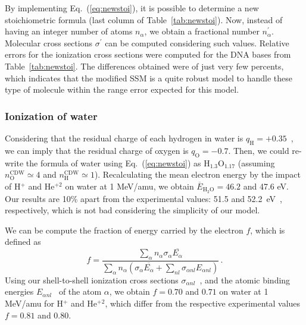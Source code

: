 \documentclass[preprint,12pt]{article}
\begin{document}
By implementing Eq.~(\ref{eq:newstoi}), it is possible to determine a 
new stoichiometric formula (last column of Table~\ref{tab:newstoi}). 
Now, instead of having an integer number of atoms $n_{\alpha}$, we obtain 
a fractional number $n_{\alpha}^{\prime}$. 
Molecular cross sections $\sigma^{\prime}$ can be computed considering 
such values. Relative errors for the ionization cross sections were 
computed for the DNA bases from Table~\ref{tab:newstoi}. The differences 
obtained were of just very few percents, which indicates that the modified 
SSM is a quite robust model to handle these type of molecule within 
the range error expected for this model.


\subsubsection{Ionization of water}

Considering that the residual charge of each hydrogen in water is 
$q_{\text{H}}=+0.35$~\cite{rappe1991}, we can imply that the residual charge 
of oxygen is $q_{\text{O}}=-0.7$. Then, we could re-write the formula 
of water using Eq.~(\ref{eq:newstoi}) as H$_{1.3}$O$_{1.17}$ (assuming
$n_{\text{O}}^{\text{CDW}}\simeq 4$ and $n_{\text{H}}^{\text{CDW}}\simeq 1$). 
Recalculating the mean electron energy by the impact of H$^{+}$ and 
He$^{+2}$ on water at 1 MeV/amu, we obtain 
$\overline{E}_{\text{H}_2\text{O}}=46.2$ and 47.6 eV. Our results 
are 10\% apart from the experimental values: 51.5 and 
52.2~eV~\cite{pimblott2007}, respectively, which is not bad considering 
the simplicity of our model.

We can be compute the fraction of energy carried by 
the electron $f$, which is defined as
\begin{equation}
f=\frac{\sum\limits_{\alpha}n_{\alpha}\sigma_{\alpha}
\overline{E_{\alpha}}}{\sum\limits_{\alpha}n_{\alpha}(\sigma_{\alpha}
\overline{E_{\alpha}}+\sum\limits_{nl}\sigma_{\alpha nl}E_{\alpha nl})}\,.
\label{90}
\end{equation}
Using our shell-to-shell ionization cross sections 
$\sigma_{\alpha nl}$~\cite{miraglia2019}, and the atomic binding energies
$E_{\alpha nl}$~\cite{clementi} of the atom $\alpha$, we obtain 
$f=0.70$ and $0.71$ on water at 1 MeV/amu for H$^{+}$ and He$^{+2}$, 
which differ from the respective experimental values $f=0.81$ and $0.80$.
\end{document}
